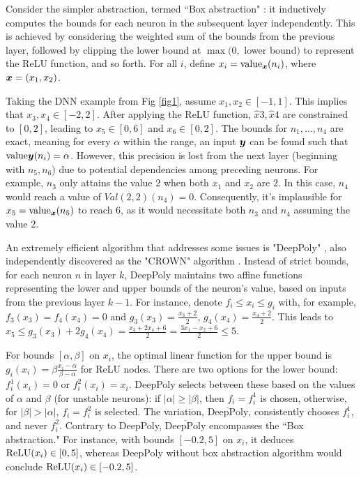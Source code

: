 Consider the simpler abstraction, termed ``Box abstraction" \cite{deeppoly}: it inductively computes the bounds for each neuron in the subsequent layer independently. This is achieved by considering the weighted sum of the bounds from the previous layer, followed by clipping the lower bound at $\max(0,$ lower bound$)$ to represent the ReLU function, and so forth. For all $i$, define $x_i={\textrm{value}}_{\boldsymbol{x}}(n_i)$, where $\boldsymbol{x}=(x_1,x_2)$.

Taking the DNN example from Fig \ref{fig1}, assume $x_1,x_2 \in [-1,1]$. This implies that $x_3,x_4 \in [-2,2]$. After applying the ReLU function, $\hat{x}3,\hat{x}4$ are constrained to $[0,2]$, leading to $x_5 \in [0,6]$ and $x_6 \in [0,2]$. The bounds for $n_1, \ldots, n_4$ are exact, meaning for every $\alpha$ within the range, an input $\boldsymbol{y}$ can be found such that ${\textrm{value}}{\boldsymbol{y}}(n_i)=\alpha$. However, this precision is lost from the next layer (beginning with $n_5, n_6$) due to potential dependencies among preceding neurons. For example, $n_3$ only attains the value $2$ when both $x_1$ and $x_2$ are $2$. In this case, $n_4$ would reach a value of $Val{(2,2)}(n_4)=0$. Consequently, it's implausible for $x_5={\textrm{value}}_{\boldsymbol{x}}(n_5)$ to reach $6$, as it would necessitate both $n_3$ and $n_4$ assuming the value $2$.

An extremely efficient algorithm that addresses some issues is "DeepPoly" \cite{deeppoly}, also independently discovered as the "CROWN" algorithm \cite{crown}. Instead of strict bounds, for each neuron $n$ in layer $k$, DeepPoly maintains two affine functions representing the lower and upper bounds of the neuron's value, based on inputs from the previous layer $k-1$. For instance, denote $f_i \leq x_i \leq g_i$ with, for example, $f_{3}(x_3)=f_4(x_4)=0$ and $g_3(x_3) = \frac{x_3+2}{2}$, $g_4(x_4) = \frac{x_4+2}{2}$. This leads to $x_5 \leq g_3(x_3) + 2 g_4(x_4) = \frac{x_3 + 2x_4 + 6}{2} = \frac{3x_1 - x_2 + 6}{2}\leq 5$.

For bounds $[\alpha,\beta]$ on $x_i$, the optimal linear function for the upper bound is $g_i(x_i)= \beta \frac{x_i-\alpha}{\beta-\alpha}$ for ReLU nodes. There are two options for the lower bound: $f^1_i(x_i) = 0$ or $f^2_i(x_i)=x_i$. DeepPoly selects between these based on the values of $\alpha$ and $\beta$ (for unstable neurons): if $|\alpha|\geq |\beta|$, then $f_i=f^1_i$ is chosen, otherwise, for $|\beta|>|\alpha|$, $f_i=f^2_i$ is selected. The variation, {\em $\overline{\mbox{DeepPoly}}$}, consistently chooses $f^1_i$, and never $f^2_i$. Contrary to DeepPoly, {\em $\overline{\mbox{DeepPoly}}$} encompasses the ``Box abstraction." For instance, with bounds $[-0.2,5]$ on $x_i$, it deduces $\mathrm{ReLU}(x_i) \in [0,5]$, whereas  DeepPoly without box abstraction algorithm would conclude $\mathrm{ReLU}(x_i) \in [-0.2,5]$.


